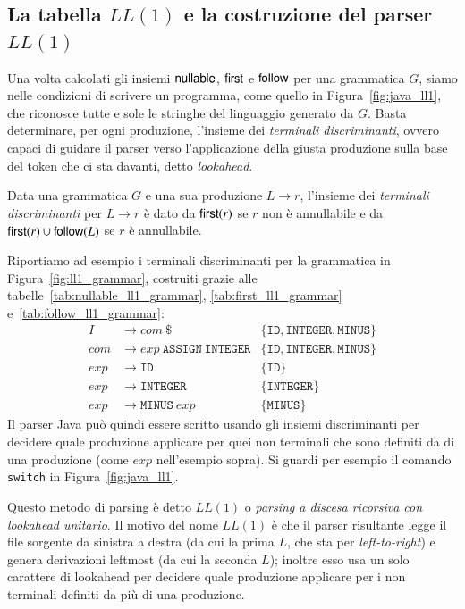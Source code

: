 \subsection{La tabella $\mathit{LL}(1)$ e la costruzione del parser
            $\mathit{LL}(1)$}
  \label{subsec:ll1_table}
%
Una volta calcolati gli insiemi $\mathsf{nullable}$, $\mathsf{first}$ e $\mathsf{follow}$
per una grammatica $G$, siamo nelle
condizioni di scrivere un programma, come quello in Figura~\ref{fig:java_ll1},
che riconosce tutte e sole le stringhe del linguaggio generato da $G$.
Basta determinare, per ogni produzione, l'insieme dei
\emph{terminali discriminanti}, ovvero capaci di guidare il parser verso
l'applicazione della giusta produzione sulla base del token che ci sta
davanti, detto \emph{lookahead}.
%
\begin{definition}\label{def:ll_discriminant}
Data una grammatica $G$ e una sua produzione $L\to r$, l'insieme dei
\emph{terminali discriminanti} per $L\to r$ \`e dato da $\mathsf{first}(r)$ se
$r$ non \`e annullabile e da $\mathsf{first}(r)\cup\mathsf{follow}(L)$ se $r$ \`e
annullabile.
\end{definition}
%
\noindent
Riportiamo ad esempio i terminali discriminanti per la grammatica
in Figura~\ref{fig:ll1_grammar}, costruiti grazie alle
tabelle~\eqref{tab:nullable_ll1_grammar}, \eqref{tab:first_ll1_grammar}
e~\eqref{tab:follow_ll1_grammar}:
%
\begin{align*}
  \mathit{I}&\to\mathit{com}\ \mathtt{\$} & \{\mathtt{ID},\mathtt{INTEGER},\mathtt{MINUS}\}\\
  \mathit{com}&\to\mathit{exp}\ \mathtt{ASSIGN}\ \mathtt{INTEGER} &
     \{\mathtt{ID},\mathtt{INTEGER},\mathtt{MINUS}\}\\
  \mathit{exp}&\to\mathtt{ID} & \{\mathtt{ID}\} \\
  \mathit{exp}&\to\mathtt{INTEGER} & \{\mathtt{INTEGER}\} \\
  \mathit{exp}&\to\mathtt{MINUS}\ \mathit{exp} & \{\mathtt{MINUS}\}
\end{align*}
%
Il parser Java pu\`o quindi essere scritto usando gli insiemi discriminanti
per decidere quale produzione applicare per quei non terminali che sono
definiti da \piu di una produzione (come $\mathit{exp}$ nell'esempio sopra).
Si guardi per esempio il comando \texttt{switch} in Figura~\ref{fig:java_ll1}.

Questo metodo di parsing \`e detto $\mathit{LL}(1)$
o \emph{parsing a discesa ricorsiva
con lookahead unitario}. Il motivo del nome $\mathit{LL}(1)$ \`e che il parser
risultante legge il file sorgente da sinistra a destra (da cui la prima
$L$, che sta per \emph{left-to-right}) e genera derivazioni leftmost (da cui la
seconda $L$); inoltre esso usa un solo carattere di lookahead per decidere
quale produzione applicare per i non terminali definiti da pi\`u di una
produzione.

